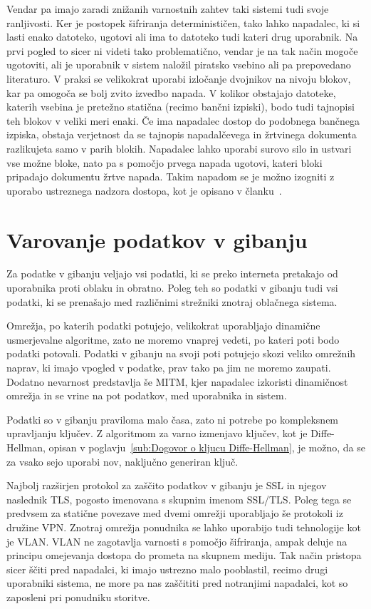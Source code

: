 \documentclass[12pt,a4paper,openany,tikz]{book}
\theoremstyle{plain}
\theoremstyle{definition}
\begin{document}
Vendar pa imajo zaradi znižanih varnostnih zahtev taki sistemi tudi svoje ranljivosti. Ker je postopek šifriranja determinističen, tako lahko napadalec, ki si lasti enako datoteko, ugotovi ali ima to datoteko tudi kateri drug uporabnik. Na prvi pogled to sicer ni videti tako problematično, vendar je na tak način mogoče ugotoviti, ali je uporabnik v sistem naložil piratsko vsebino ali pa prepovedano literaturo. V praksi se velikokrat uporabi izločanje dvojnikov na nivoju blokov, kar pa omogoča se bolj zvito izvedbo napada. V kolikor obstajajo datoteke, katerih vsebina je pretežno statična (recimo bančni izpiski), bodo tudi tajnopisi teh blokov v veliki meri enaki. Če ima napadalec dostop do podobnega bančnega izpiska, obstaja verjetnost da se tajnopis napadalčevega in žrtvinega dokumenta razlikujeta samo v parih blokih. Napadalec lahko uporabi surovo silo in ustvari vse možne bloke, nato pa s pomočjo prvega napada ugotovi, kateri bloki pripadajo dokumentu žrtve napada. Takim napadom se je možno izogniti z uporabo ustreznega nadzora dostopa, kot je opisano v članku~\cite{keelveedhi2013dupless}.

\section{Varovanje podatkov v gibanju}
\label{sec:Varovanje podatkov v gibanju}

Za podatke v gibanju veljajo vsi podatki, ki se preko interneta pretakajo od uporabnika proti oblaku in obratno. Poleg teh so podatki v gibanju tudi vsi podatki, ki se prenašajo med različnimi strežniki znotraj oblačnega sistema.

Omrežja, po katerih podatki potujejo, velikokrat uporabljajo dinamične usmerjevalne algoritme, zato ne moremo vnaprej vedeti, po kateri poti bodo podatki potovali. Podatki v gibanju na svoji poti potujejo skozi veliko omrežnih naprav, ki imajo vpogled v podatke, prav tako pa jim ne moremo zaupati. Dodatno nevarnost predstavlja še \gls{MITM}, kjer napadalec izkoristi dinamičnost omrežja in se vrine na pot podatkov, med uporabnika in sistem.

Podatki so v gibanju praviloma malo časa, zato ni potrebe po kompleksnem upravljanju ključev. Z algoritmom za varno izmenjavo ključev, kot je Diffe-Hellman, opisan v poglavju~\ref{sub:Dogovor o kljucu Diffe-Hellman}, je možno, da se za vsako sejo uporabi nov, naključno generiran ključ.

Najbolj razširjen protokol za zaščito podatkov v gibanju je \gls{SSL} in njegov naslednik \gls{TLS}, pogosto imenovana s skupnim imenom SSL/TLS. Poleg tega se predvsem za statične povezave med dvemi omrežji uporabljajo še protokoli iz družine VPN. Znotraj omrežja ponudnika se lahko uporabijo tudi tehnologije kot je VLAN. VLAN ne zagotavlja varnosti s pomočjo šifriranja, ampak deluje na principu omejevanja dostopa do prometa na skupnem mediju. Tak način pristopa sicer ščiti pred napadalci, ki imajo ustrezno malo pooblastil, recimo drugi uporabniki sistema, ne more pa nas zaščititi pred notranjimi napadalci, kot so zaposleni pri ponudniku storitve.
\end{document}
